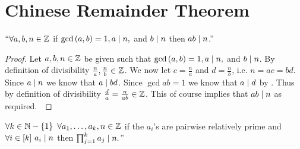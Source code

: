     \section{Chinese Remainder Theorem}
        \begin{lemma}
            $``\forall a, b, n \in \mathbb{Z}$ if $\mathrm{gcd}\left(a, b\right) = 1, a \mid n,$ and $b \mid n$
            then $ab \mid n$.''
            \label{CRT uniquness lemma}
        \end{lemma}
        \begin{proof}
            Let $a, b, n \in \mathbb{Z}$ be given such that $\mathrm{gcd}\left(a, b\right) = 1, a \mid n,$ and
            $b \mid n$. By definition of divisibility $\frac{n}{a}, \frac{n}{b} \in \mathbb{Z}$.
            We now let $c = \frac{n}{a}$ and $d = \frac{n}{b}$, i.e. $n = ac = bd$. Since $a \mid n$
            we know that $a \mid bd$. Since $\gcd{a}{b} = 1$ we know that $a \mid d$ by 
            . Thus by definition of divisibility $\frac{d}{a} = \frac{n}{ab} \in \mathbb{Z}$.
            This of course implies that $ab \mid n$ as required.~\QED
        \end{proof}
        \begin{corollary}
            $\forall k \in \setsub{\set{N}}{\Set{1}} \ \forall a_1, \dots, a_k, n \in \set{Z}$ if
            the $a_i$'s are pairwise relatively prime and $\forall i \in [k] \ a_i \mid n$ then
            $\prod_{j = 1}^k a_j \mid n.$''
            \label{CRT uniquness corollary}
        \end{corollary}
